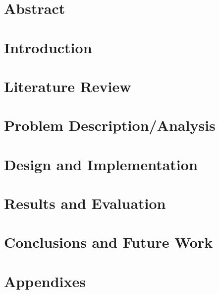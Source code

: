 \documentclass[a4paper, 11pt]{report}
\begin{document}

\chapter*{Abstract}

\tableofcontents
\chapter{Introduction} %

\chapter{Literature Review} %

\chapter{Problem Description/Analysis} %

\chapter{Design and Implementation}
\chapter{Results and Evaluation}
\chapter{Conclusions and Future Work}
\appendix
{}


\chapter{Appendixes}

\end{document}
